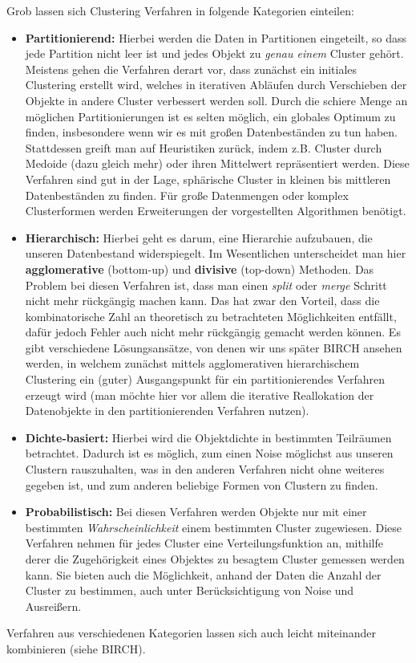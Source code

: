 Grob lassen sich Clustering Verfahren in folgende
Kategorien einteilen:
\begin{itemize}
\item \textbf{Partitionierend:} Hierbei werden die Daten in
Partitionen eingeteilt, so dass jede Partition nicht leer ist und jedes
Objekt zu \textit{genau einem} Cluster gehört. Meistens gehen
die Verfahren derart vor, dass zunächst ein initiales Clustering erstellt
wird, welches in iterativen Abläufen durch Verschieben der Objekte
in andere Cluster verbessert werden soll. Durch die schiere Menge
an möglichen Partitionierungen ist es selten möglich, ein globales
Optimum zu finden, insbesondere wenn wir es mit großen
Datenbeständen zu tun haben. Stattdessen greift man auf Heuristiken
zurück, indem z.B. Cluster durch Medoide (dazu gleich mehr) oder
ihren Mittelwert repräsentiert werden. Diese Verfahren sind gut in der
Lage, sphärische Cluster in kleinen bis mittleren Datenbeständen zu 
finden. Für große Datenmengen oder komplex Clusterformen werden
Erweiterungen der vorgestellten Algorithmen benötigt.
\item \textbf{Hierarchisch:} Hierbei geht es darum, eine Hierarchie
aufzubauen, die unseren Datenbestand widerspiegelt. Im Wesentlichen
unterscheidet man hier \textbf{agglomerative} (bottom-up) und
\textbf{divisive} (top-down) Methoden. Das Problem bei diesen 
Verfahren ist, dass man einen \textit{split} oder \textit{merge} 
Schritt nicht mehr rückgängig machen kann. Das hat zwar den Vorteil,
dass die kombinatorische Zahl an theoretisch zu betrachteten
Möglichkeiten entfällt, dafür jedoch Fehler auch nicht mehr rückgängig
gemacht werden können. Es gibt verschiedene Lösungsansätze, von
denen wir uns später BIRCH ansehen werden, in welchem zunächst
mittels agglomerativen hierarchischem Clustering ein (guter) 
Ausgangspunkt für ein partitionierendes Verfahren erzeugt wird (man
möchte hier vor allem die iterative Reallokation der Datenobjekte in
den partitionierenden Verfahren nutzen).
\item \textbf{Dichte-basiert:} Hierbei wird die Objektdichte
in bestimmten Teilräumen betrachtet. Dadurch ist es möglich, zum
einen Noise möglichst aus unseren Clustern rauszuhalten, was in
den anderen Verfahren nicht ohne weiteres gegeben ist, und zum 
anderen beliebige Formen von Clustern zu finden. 
\item \textbf{Probabilistisch:} Bei diesen Verfahren werden
Objekte nur mit einer bestimmten \textit{Wahrscheinlichkeit} einem
bestimmten Cluster zugewiesen. Diese Verfahren nehmen für jedes
Cluster eine Verteilungsfunktion an, mithilfe derer die Zugehörigkeit
eines Objektes zu besagtem Cluster gemessen werden kann. Sie bieten
auch die Möglichkeit, anhand der Daten die Anzahl der Cluster zu 
bestimmen, auch unter Berücksichtigung von Noise und Ausreißern.
\end{itemize}
Verfahren aus verschiedenen Kategorien lassen sich auch leicht
miteinander kombinieren (siehe BIRCH).

